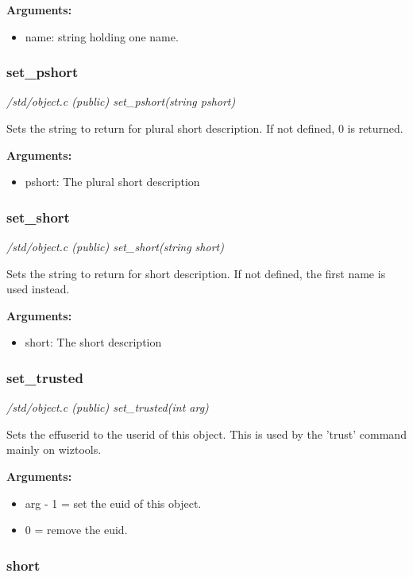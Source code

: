 {\bf Arguments:}
\begin{itemize}
\item     name: string holding one name.
\end{itemize}


\subsubsection{set\_pshort}

{\em /std/object.c (public) set\_pshort(string pshort)}

Sets the string to return for plural short description.
If not defined, 0 is returned.

{\bf Arguments:}
\begin{itemize}
\item      pshort: The plural short description
\end{itemize}


\subsubsection{set\_short}

{\em /std/object.c (public) set\_short(string short)}

Sets the string to return for short description.
If not defined, the first name is used instead.

{\bf Arguments:}
\begin{itemize}
\item      short: The short description
\end{itemize}


\subsubsection{set\_trusted}

{\em /std/object.c (public) set\_trusted(int arg)}

Sets the effuserid to the userid of this object. This is
used by the 'trust' command mainly on wiztools.

{\bf Arguments:}
\begin{itemize}
\item     arg - 1 = set the euid of this object.
\item 0 = remove the euid.
\end{itemize}


\subsubsection{short}

